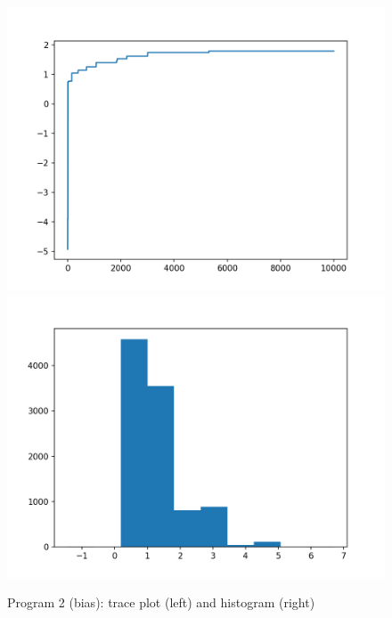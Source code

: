 \documentclass[12pt]{article}%
\theoremstyle{definition}
\begin{document}
	\begin{figure}[h]
	\centering
	\includegraphics[scale=0.4]{p2traceplot_bias.png}
	\includegraphics[scale=0.4]{p2histogram_bias.png}
	\caption{Program 2 (bias): trace plot (left) and histogram (right)}
	\end{figure}
	
\end{document}
